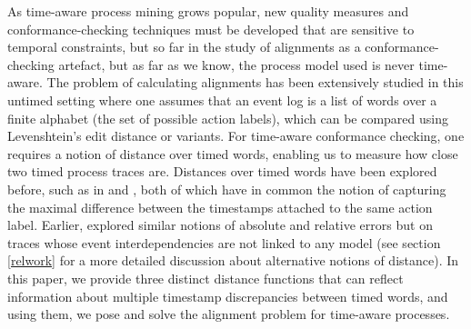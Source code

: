 \documentclass[conference]{IEEEtran}
\begin{document}
    As time-aware process mining grows popular, new quality measures and conformance-checking techniques must be developed that are sensitive to temporal constraints, but so far in the study of alignments as a conformance-checking artefact, but as far as we know, the process model used is never time-aware. 
The problem of calculating alignments has been extensively studied \cite{Adriansyah2014AligningOA,BCC21} in this untimed setting
where one assumes that an event log is a list of words over a finite alphabet (the set of possible action labels), which can be compared using Levenshtein's edit distance or variants.
For time-aware conformance checking, one requires a notion of distance over timed words, enabling us to measure how close two timed process traces are. 
Distances over timed words have been explored before, such as in \cite{ABD18} and \cite{CIM14}, both of which have in common the notion of capturing the maximal difference between the timestamps attached to the same action label. 
Earlier, \cite{alldistHenz} explored similar notions of absolute and relative errors but on traces whose event interdependencies are not linked to any model (see section \ref{relwork} for a more detailed discussion about alternative notions of distance). 
In this paper, we provide three distinct distance functions that can reflect information about multiple timestamp discrepancies between timed words, and using them, we pose and solve the alignment problem for time-aware processes.

    
\end{document}
